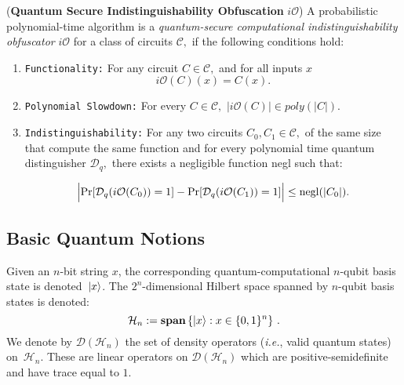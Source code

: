 \begin{definition}\label{def:qiO} {\rm({\bf Quantum Secure Indistinguishability Obfuscation} $i\mathcal{O}$)}
A probabilistic polynomial-time algorithm is a \emph{quantum-secure computational indistinguishability obfuscator} $i\mathcal{O}$ for a class of circuits ${\mathcal C},$ if the following conditions hold:

\begin{enumerate}
\item {\tt Functionality:} For any circuit $C\in {\mathcal C},$ and for all inputs $x$ $$i\mathcal{O}(C)(x)=C(x).$$
\item  {\tt Polynomial Slowdown:}  For every $C\in \mathcal{C},$  $|i\mathcal{O}(C)| \in poly(|C|).$
\item {\tt Indistinguishability:} For any two circuits $C_0,C_1\in {\mathcal C},$ of the same size  that compute the same function
 and for every polynomial time quantum distinguisher $\mathcal{D}_q,$  there exists a negligible function {\rm negl} such that:

					$$\Big | {\rm Pr}[\mathcal{D}_q(i\mathcal{O}(C_0))=1]-{\rm Pr}[\mathcal{D}_q(i\mathcal{O}(C_1))=1] \Big |\leq  {\rm negl}(|C_0|).$$			
\end{enumerate}										
\end{definition}



\subsection{Basic Quantum Notions}
\label{sec:quantum-prelims}
Given an $n$-bit string $x$, the corresponding quantum-computational $n$-qubit basis state is denoted~${\lvert}x\rangle$. The $2^n$-dimensional Hilbert space spanned by $n$-qubit basis states is denoted:
\begin{equation}
\label{eq:hilbert-space}
\mathcal{H}_n := \textbf{span} \left\{ {\lvert}x\rangle : x \in \{0,1\}^{n} \right\}\,.
\end{equation}
We denote by $\mathcal{D}(\mathcal{H}_n)$ the set of density operators (\emph{i.e.}, valid quantum states) on~$\mathcal{H}_n$. These are linear operators on $\mathcal{D}(\mathcal{H}_n)$ which are positive-semidefinite and have trace equal to $1.$


